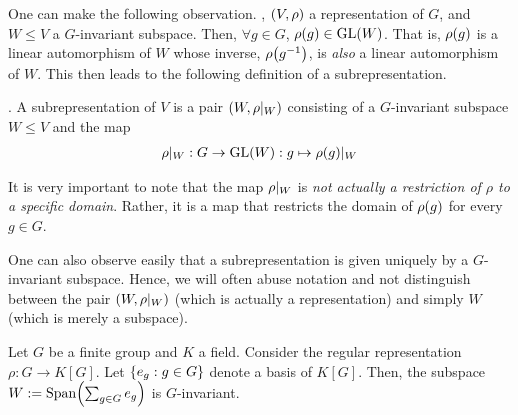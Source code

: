 One can make the following observation. , $\left( V,\rho \right)$ a representation of $G$, and $W \leq V$ a $G$-invariant subspace. Then, $\forall g \in G$, $\rho\!\left( g \right) \in \operatorname{GL}\!\left( W \right)$. That is, $\rho\!\left( g \right)$ is a linear automorphism of $W$ whose inverse, $\rho\!\left( g^{-1} \right)$, is \textit{also} a linear automorphism of $W$. This then leads to the following definition of a subrepresentation.

\begin{boxdefinition}[Subrepresentation]
    . A subrepresentation of $V$ is a pair $\left( W, \rho\vert_{W} \right)$ consisting of a $G$-invariant subspace $W \leq V$ and the map
    \begin{align*}
        \rho\vert_{W} : G \to \operatorname{GL}\!\left( W \right) : g \mapsto \rho\!\left( g \right)\!\vert_W
    \end{align*}
\end{boxdefinition}
It is very important to note that the map $\rho\vert_{W}$ is \textit{not actually a restriction of $\rho$ to a specific domain}. Rather, it is a map that restricts the domain of $\rho\!\left( g \right)$ for every $g \in G$.

One can also observe easily that a subrepresentation is given uniquely by a $G$-invariant subspace. Hence, we will often abuse notation and not distinguish between the pair $\left( W, \rho\vert_{W} \right)$ (which is actually a representation) and simply $W$ (which is merely a subspace).

\begin{boxexample}
    Let $G$ be a finite group and $K$ a field. Consider the regular representation $\rho : G \to K[G]$. Let $\left\{ e_g : g \in G \right\}$ denote a basis of $K[G]$. Then, the subspace $W := \operatorname{Span}\!\left( \sum_{g \in G} e_g \right)$ is $G$-invariant.
\end{boxexample}
